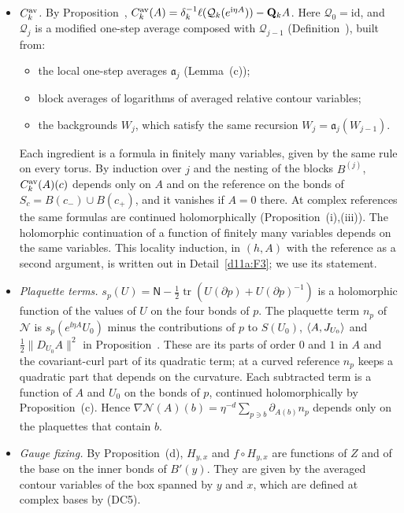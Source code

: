 \begin{step}
\begin{itemize}
\item[(i)] \emph{$C^{\rm av}_k$.} By Proposition~, $C^{\rm av}_k(A)=\delta_k^{-1}\ell(\mathcal Q_k(e^{\mathrm i\eta A}))-\mathbf Q_kA$. Here $\mathcal Q_0=\mathrm{id}$, and $\mathcal Q_j$ is a modified one-step average composed with $\mathcal Q_{j-1}$ (Definition~), built from:
  \begin{itemize}
  \item the local one-step averages $\mathfrak a_j$ (Lemma~(c));
  \item block averages of logarithms of averaged relative contour variables;
  \item the backgrounds $W_j$, which satisfy the same recursion $W_j=\mathfrak a_j(W_{j-1})$.
  \end{itemize}
  Each ingredient is a formula in finitely many variables, given by the same rule on every torus. By induction over $j$ and the nesting of the blocks $B^{(j)}$, $C^{\rm av}_k(A)(c)$ depends only on $A$ and on the reference on the bonds of $S_c=B(c_-)\cup B(c_+)$, and it vanishes if $A=0$ there. At complex references the same formulas are continued holomorphically (Proposition~(i),(iii)). The holomorphic continuation of a function of finitely many variables depends on the same variables. This locality induction, in $(h,A)$ with the reference as a second argument, is written out in Detail~\ref{d11a:F3}; we use its statement.
\item[(ii)] \emph{Plaquette terms.} $s_p(U)=\mathsf N-\frac12\operatorname{tr}(U(\partial p)+U(\partial p)^{-1})$ is a holomorphic function of the values of $U$ on the four bonds of $p$. The plaquette term $n_p$ of $\mathcal N$ is $s_p(e^{\ii\eta A}U_0)$ minus the contributions of $p$ to $S(U_0)$, $\langle A,J_{U_0}\rangle$ and $\frac12\|D_{U_0}A\|^2$ in Proposition~. These are its parts of order $0$ and $1$ in $A$ and the covariant-curl part of its quadratic term; at a curved reference $n_p$ keeps a quadratic part that depends on the curvature. Each subtracted term is a function of $A$ and $U_0$ on the bonds of $p$, continued holomorphically by Proposition~(c). Hence $\nabla\mathcal N(A)(b)=\eta^{-d}\sum_{p\ni b}\partial_{A(b)}n_p$ depends only on the plaquettes that contain $b$.
\item[(iii)] \emph{Gauge fixing.} By Proposition~(d), $H_{y,x}$ and $f\circ H_{y,x}$ are functions of $Z$ and of the base on the inner bonds of $B'(y)$. They are given by the averaged contour variables of the box spanned by $y$ and $x$, which are defined at complex bases by (DC5).

\end{itemize}
\end{step}
